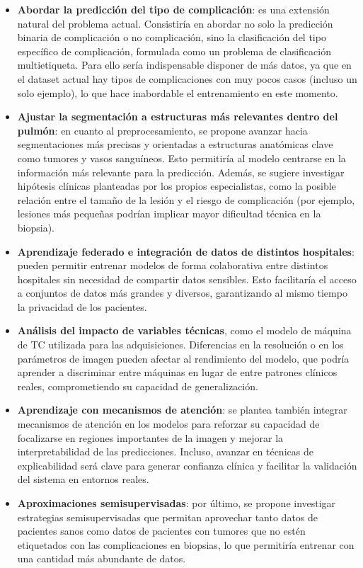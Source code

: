 \begin{itemize}
    \item \textbf{Abordar la predicción del tipo de complicación}: es una extensión natural del problema actual.  Consistiría en abordar no solo la predicción binaria de complicación o no complicación, sino la clasificación del tipo específico de complicación, formulada como un problema de clasificación multietiqueta. Para ello sería indispensable disponer de más datos, ya que en el dataset actual hay tipos de complicaciones con muy pocos casos (incluso un solo ejemplo), lo que hace inabordable el entrenamiento en este momento.
    \item \textbf{Ajustar la segmentación a estructuras más relevantes dentro del pulmón}: en cuanto al preprocesamiento, se propone avanzar hacia segmentaciones más precisas y orientadas a estructuras anatómicas clave como tumores y vasos sanguíneos. Esto permitiría al modelo centrarse en la información más relevante para la predicción. Además, se sugiere investigar hipótesis clínicas planteadas por los propios especialistas, como la posible relación entre el tamaño de la lesión y el riesgo de complicación (por ejemplo, lesiones más pequeñas podrían implicar mayor dificultad técnica en la biopsia).
    \item \textbf{Aprendizaje federado e integración de datos de distintos hospitales}: pueden permitir entrenar modelos de forma colaborativa entre distintos hospitales sin necesidad de compartir datos sensibles. Esto facilitaría el acceso a conjuntos de datos más grandes y diversos, garantizando al mismo tiempo la privacidad de los pacientes.
    \item \textbf{Análisis del impacto de variables técnicas}, como el modelo de máquina de TC utilizada para las adquisiciones. Diferencias en la resolución o en los parámetros de imagen pueden afectar al rendimiento del modelo, que podría aprender a discriminar entre máquinas en lugar de entre patrones clínicos reales, comprometiendo su capacidad de generalización.
    \item \textbf{Aprendizaje con mecanismos de atención}: se plantea también integrar mecanismos de atención en los modelos para reforzar su capacidad de focalizarse en regiones importantes de la imagen y mejorar la interpretabilidad de las predicciones. Incluso, avanzar en técnicas de explicabilidad será clave para generar confianza clínica y facilitar la validación del sistema en entornos reales.
    \item \textbf{Aproximaciones semisupervisadas}: por último, se propone investigar estrategias semisupervisadas que permitan aprovechar tanto datos de pacientes sanos como datos de pacientes con tumores que no estén etiquetados con las complicaciones en biopsias, lo que permitiría entrenar con una cantidad más abundante de datos.
\end{itemize}

\endinput
